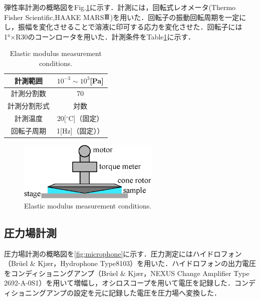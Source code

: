 弾性率計測の概略図をFig.\ref{fig:elastic-measure}に示す．計測には，回転式レオメータ(Thermo Fisher Scientific,HAAKE MARS$\rm I\hspace{-.15em}I\hspace{-.15em}I$)を用いた．回転子の振動回転周期を一定にし，振幅を変化させることで溶液に印可する応力を変化させた．回転子には1°×R30のコーンロータを用いた．計測条件をTable\ref{table:elastic}に示す．

\begin{table}[ht]
    \centering
    \caption{Elastic modulus measurement conditions.}
    \label{table:elastic}
    \begin{tabular}{c|c}\hline
        計測範囲     & $10^{-3} \sim 10^3$[Pa] \\ \hline
        計測分割数   & 70                      \\ \hline
        計測分割形式 & 対数                    \\ \hline
        計測温度     & 20[$^\circ$C]（固定）   \\ \hline
        回転子周期   & 1[Hz]（固定））         \\ \hline
    \end{tabular}
\end{table}

\begin{figure}[ht]
    \centering
    \includegraphics[width=0.6\textwidth]{2-Methods/rheometer.eps}
    \caption{Elastic modulus measurement conditions.}
    \label{fig:elastic-measure}
\end{figure}

\subsection{圧力場計測}

圧力場計測の概略図を\ref{fig:microphone}に示す．圧力測定にはハイドロフォン（Br\"{u}el \& Kj\ae r，Hydrophone Type8103）を用いた．ハイドロフォンの出力電圧をコンディショニングアンプ（Br\"{u}el \& Kj\ae r，NEXUS Change Amplifier Type 2692-A-0S1）を用いて増幅し，オシロスコープを用いて電圧を記録した．コンディショニングアンプの設定を元に記録した電圧を圧力場へ変換した．

